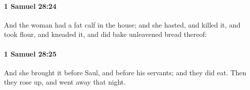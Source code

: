 		\paragraph{1 Samuel 28:24} %
			\label{1SAMUEL-28-24}

			And the woman had a fat calf in the house; and she hasted, and killed it, and took flour, and kneaded it, and did bake unleavened bread thereof:


		\paragraph{1 Samuel 28:25} %
			\label{1SAMUEL-28-25}

			And she brought it before Saul, and before his servants; and they did eat. Then they rose up, and went away that night.

